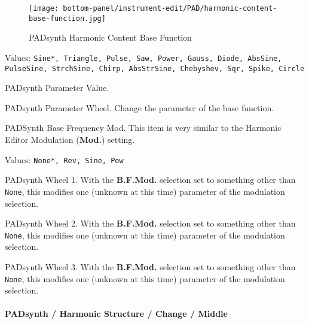 \begin{figure}[H]
   \centering
   \texttt{[image: bottom-panel/instrument-edit/PAD/harmonic-content-base-function.jpg]}
   \caption{PADsynth Harmonic Content Base Function}
   \label{fig:padsynth_harmonic_content_base_function}
\end{figure}

   Values: \texttt{Sine*, Triangle, Pulse, Saw, Power, Gauss, Diode, AbsSine,
           PulseSine, StrchSine, Chirp, AbsStrSine, Chebyshev,
           Sqr, Spike, Circle}

   PADsynth Parameter Value.

   PADsynth Parameter Wheel.
   Change the parameter of the base function.

   PADSynth Base Frequency Mod.
   This item is very similar to the Harmonic Editor Modulation
   (\textbf{Mod.}) setting.

   Values: \texttt{None*, Rev, Sine, Pow}

   PADsynth Wheel 1.
   With the \textbf{B.F.Mod.} selection set to something other than
   \texttt{None}, this modifies one (unknown at this time) parameter of the
   modulation selection.

   PADsynth Wheel 2.
   With the \textbf{B.F.Mod.} selection set to something other than
   \texttt{None}, this modifies one (unknown at this time) parameter of the
   modulation selection.

   PADsynth Wheel 3.
   With the \textbf{B.F.Mod.} selection set to something other than
   \texttt{None}, this modifies one (unknown at this time) parameter of the
   modulation selection.

\paragraph{PADsynth / Harmonic Structure / Change / Middle}
\label{paragraph:padsynth_harmonic_structure_change_middle}

